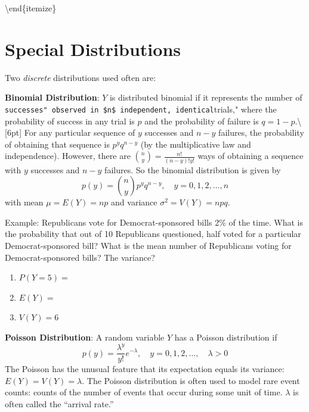 \documentclass[]{book}
\theoremstyle{definition}
\theoremstyle{definition}
\theoremstyle{definition}
\theoremstyle{remark}
\begin{document}
\textbackslash{}end\{itemize\}

\section{Special Distributions}\label{special-distributions}

Two \emph{discrete} distributions used often are:

\textbf{Binomial Distribution}: \(Y\) is distributed binomial if it
represents the number of
\texttt{successes"\ observed\ in\ \$n\$\ independent,\ identical}trials,"
where the probability of success in any trial is \(p\) and the
probability of failure is \(q=1-p\).\textbackslash{}{[}6pt{]} For any
particular sequence of \(y\) successes and \(n-y\) failures, the
probability of obtaining that sequence is \(p^y q^{n-y}\) (by the
multiplicative law and independence). However, there are
\(\binom{n}{y}=\frac{n!}{(n-y)!y!}\) ways of obtaining a sequence with
\(y\) successes and \(n-y\) failures. So the binomial distribution is
given by \[p(y)=\binom{n}{y}p^y q^{n-y}, \quad y=0,1,2,\ldots,n\] with
mean \(\mu=E(Y)=np\) and variance \(\sigma^2=V(Y)=npq\).

\begin{framed}
Example: Republicans vote for Democrat-sponsored bills 2\% of the time. What is the probability that out of 10 Republicans questioned, half voted for a particular Democrat-sponsored bill?  What is the mean number of Republicans voting for Democrat-sponsored bills?  The variance?\\
  \parbox[c]{4.25in}{
  \begin{enumerate}
  \item $P(Y=5)=$
  \item $E(Y)=$ 
  \item $V(Y)=6$
  \end{enumerate}}

\end{framed}

\textbf{Poisson Distribution}: A random variable \(Y\) has a Poisson
distribution if
\[p(y)=\frac{\lambda^y}{y!}e^{-\lambda}, \quad y=0,1,2,\ldots, \quad \lambda>0\]
The Poisson has the unusual feature that its expectation equals its
variance: \(E(Y)=V(Y)=\lambda\). The Poisson distribution is often used
to model rare event counts: counts of the number of events that occur
during some unit of time. \(\lambda\) is often called the ``arrival
rate.''
\end{document}

